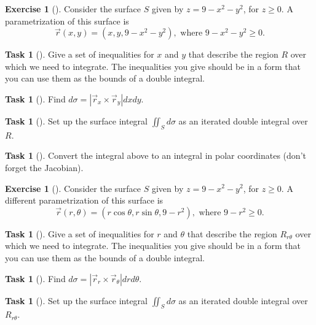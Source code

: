 \documentclass[10pt,]{book}
\theoremstyle{plain}
\theoremstyle{definition}
\theoremstyle{definition}
\theoremstyle{definition}
\theoremstyle{definition}
\newtheorem{exploration}[project]{Exercise}
\newtheorem{task}[project]{Task}
\theoremstyle{definition}
\numberwithin{equation}{section}
\begin{document}
%
\begin{exploration}[]\label{exploration-277}
Consider the surface \(S\) given by \(z=9-x^2-y^2\), for \(z\geq 0\). A parametrization of this surface is%
\begin{equation*}
\vec r(x,y) = (x,y,9-x^2-y^2), \text{ where }  9-x^2-y^2\geq 0.
\end{equation*}
%
\begin{task}[]\label{task-749}
Give a set of inequalities for \(x\) and \(y\) that describe the region \(R\) over which we need to integrate. The inequalities you give should be in a form that you can use them as the bounds of a double integral.%
\end{task}
\begin{task}[]\label{task-750}
Find \(d\sigma = \left|\vec r_x\times \vec r_y\right|dxdy\).%
\end{task}
\begin{task}[]\label{task-751}
Set up the surface integral \(\iint_S d\sigma\) as an iterated double integral over \(R\).%
\end{task}
\begin{task}[]\label{task-752}
Convert the integral above to an integral in polar coordinates (don't forget the Jacobian).%
\end{task}
\end{exploration}
\begin{exploration}[]\label{exploration-278}
Consider the surface \(S\) given by \(z=9-x^2-y^2\), for \(z\geq 0\). A different parametrization of this surface is%
\begin{equation*}
\vec r(r,\theta) = (r\cos\theta,r\sin\theta,9-r^2), \text{ where }  9-r^2\geq 0.
\end{equation*}
%
\begin{task}[]\label{task-753}
Give a set of inequalities for \(r\) and \(\theta\) that describe the region \(R_{r\theta}\) over which we need to integrate. The inequalities you give should be in a form that you can use them as the bounds of a double integral.%
\end{task}
\begin{task}[]\label{task-754}
Find \(d\sigma = \left|\vec r_r\times \vec r_\theta \right|drd\theta\).%
\end{task}
\begin{task}[]\label{task-755}
Set up the surface integral \(\iint_S d\sigma\) as an iterated double integral over \(R_{r\theta}\).%
\end{task}
\end{exploration}
\end{document}
